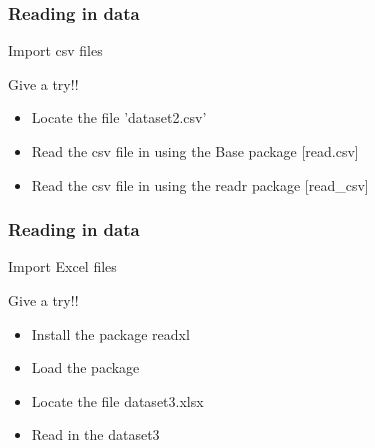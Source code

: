\documentclass{beamer}
\begin{document}
\begin{frame}[fragile]
	\frametitle{Reading in data}
	\centering \Large Import csv files

	\centering \normalsize Give a try!!
	\begin{itemize}
		\small
		\item Locate the file 'dataset2.csv'
		\item Read the csv file in using the Base package [read.csv]
		\item Read the csv file in using the readr package [read\_csv]
	\end{itemize}
\end{frame}

\begin{frame}[fragile]
	\frametitle{Reading in data}
	\centering \Large Import Excel files

	\centering \normalsize Give a try!!
	\begin{itemize}
		\small
		\item Install the package readxl
		\item Load the package
		\item Locate the file dataset3.xlsx
		\item Read in the dataset3
	\end{itemize}
\end{frame}
\end{document}
